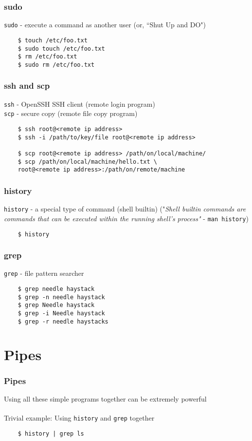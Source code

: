 \documentclass{beamer}
\begin{document}

\begin{frame}[fragile]
\frametitle{sudo}
	\texttt{sudo} - execute a command as another user (or, ``Shut Up and DO")
	\begin{verbatim}
	$ touch /etc/foo.txt
	$ sudo touch /etc/foo.txt
	$ rm /etc/foo.txt
	$ sudo rm /etc/foo.txt
	\end{verbatim}
\end{frame}


\begin{frame}[fragile]
\frametitle{ssh and scp}
	\texttt{ssh} - OpenSSH SSH client (remote login program)
	\\
	\texttt{scp} - secure copy (remote file copy program)
	\begin{verbatim}
	$ ssh root@<remote ip address>
	$ ssh -i /path/to/key/file root@<remote ip address>
	
	$ scp root@<remote ip address> /path/on/local/machine/
	$ scp /path/on/local/machine/hello.txt \
	root@<remote ip address>:/path/on/remote/machine
	\end{verbatim}
\end{frame}


\begin{frame}[fragile]
\frametitle{history}
	\texttt{history} - a special type of command (shell builtin) ("\textit{Shell builtin commands are commands that can be executed within the running shell's process"} - \texttt{man history})
	\begin{verbatim}
	$ history
	\end{verbatim}
\end{frame}


\begin{frame}[fragile]
\frametitle{grep}
	\texttt{grep} - file pattern searcher
	\begin{verbatim}
	$ grep needle haystack
	$ grep -n needle haystack
	$ grep Needle haystack
	$ grep -i Needle haystack
	$ grep -r needle haystacks
	\end{verbatim}
\end{frame}

\section{Pipes}

\begin{frame}[fragile]
\frametitle{Pipes}
	Using all these simple programs together can be extremely powerful
	\\~\\
	Trivial example: Using \texttt{history} and \texttt{grep} together
	\begin{verbatim}
	$ history | grep ls
	\end{verbatim}
\end{frame}
\end{document}
